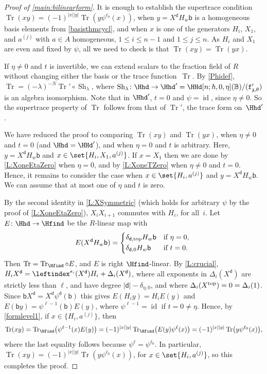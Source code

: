 \documentclass[a4paper,11pt]{amsart}
\newcommand{\Tr}{\op{Tr}}
\numberwithin{equation}{subsection}
\theoremstyle{definition}
\theoremstyle{theorem}
\theoremstyle{remark}
\newcommand\charge{{\mathfrak{z}}}
\newcommand\fct{\mathtt{f}_{\charge,\theta}}
\newcommand\Sh[1][\lambda]{\op{Sh}_{#1}}
\newcommand\ELL{\text{\scriptsize top}}%
\newcommand\bd{\mathsf{d}}
\newcommand\bb{\mathsf{b}}
\newcommand\op{\operatorname}
\newcommand{\Bo}{\mathbb{B}}
\begin{document}
      \begin{proof}[Proof of \autoref{main:bilinearform}]
It is enough to establish the supertrace condition
$\Tr(xy)=(-1)^{|x||y|}\Tr(y\psi^{\ell_0}(x))$, when $y=X^\bd H_w\bb$ is
a homogeneous basis elements from \autoref{basisthmcycl}, and when $x$
is one of the generators $H_i$, $X_1$, and $a^{(j)}$ with $a\in A$
homogeneous, $1\leq i\leq n-1$ and $1\leq j\leq n$. As $H_i$ and $X_1$
are even and fixed by $\psi$, all we need to check is that
$\Tr(xy)=\Tr(yx)$.

If $\eta\neq0$ and $t$ is invertible, we can extend scalars to the
fraction field of $R$ without changing either the basis or the trace
function~$\Tr$. By \autoref{Phidef}, $\Tr=(-\lambda)^{-N}\Tr'\circ\Sh$,
where $\Sh\colon\Hhd\to{\Hhd}'=\HHd[n;\hbar,0,\eta](\Bo)/(\fct')$ is an
algebra isomorphism. Note that in ${\Hhd}'$, $t=0$ and $\psi=\op{id}$,
since $\eta\neq0$. So the supertrace property of $\Tr$ follows from that
of $\Tr'$, the trace form on~${\Hhd}'$.

We have reduced the proof to comparing $\Tr(xy)$ and $\Tr(yx)$, when
$\eta\ne0$ and $t=0$ (and $\Hhd=\HHd'$), and when $\eta=0$ and
$t$ is arbitrary. Here, $y=X^\bd H_w\bb$ and
$x\in\set{H_i,X_1,a^{(j)}}$. If $x=X_1$ then we are done by
\autoref{L:XoneEtaZero} when $\eta=0$, and by \autoref{L:XoneTZero} when
$\eta\ne0$ and $t=0$. Hence, it remains to consider the case when
$x\in\set{H_i,a^{(j)}}$ and $y=X^\bd H_w\bb$. We can assume that at most
one of $\eta$ and $t$ is zero.

By the second identity in \autoref{L:XSymmetric} (which holds for arbitrary $\psi$ by the proof of \autoref{L:XoneEtaZero}), $X_iX_{i+1}$ commutes with $H_i$, for
all~$i$. Let $E\colon\Hhd\to\Hfind$ be the $R$-linear map with
\[
   E(X^\bd H_w\bb)=\begin{cases*}
     \delta_{\bd,\ELL}H_w\bb& if $\eta=0$, \\
     \delta_{\bd,0}H_w\bb& if $t=0$.
   \end{cases*}
\]
Then $\Tr=\Tr_{\Hfind}\circ E$, and $E$ is right $\Hfind$-linear. By
\autoref{L:crucial},
$H_iX^\bd=\leftindex^{s_i}(X^\bd)H_i+\Delta_i(X^\bd)$, where
all exponents in $\Delta_i(X^\bd)$ are strictly less than $\ell$, and
have degree $|\bd|-\delta_{\eta,0}$, and where
$\Delta_i(X^{\ELL})=0=\Delta_i(1)$. Since $\bb
X^\bd=X^\bd\psi^{\bd}(\bb)$ this gives $E(H_iy)=H_iE(y)$ and $E(\bb
y)=\psi^{\ell-1}(\bb)E(y)$, where $\psi^{\ell-1}=\op{id}$ if
$t=0\neq\eta$. Hence, by \autoref{formlevel1}, if $x\in\{H_i,a^{(j)}\}$,
then
\begin{equation}\label{Tryx}
\Tr(xy)=\Tr_{\Hfind}\bigl(\psi^{\ell-1}(x)E(y)\bigr)=(-1)^{|x||y|}\Tr_{\Hfind}\bigl(E(y)\psi^{\ell}(x)\bigr)=(-1)^{|x||y|}\Tr\bigl(y\psi^{\ell_0}(x)\bigr),
\end{equation}
where the last equality follows because $\psi^\ell=\psi^{\ell_0}$. In
particular, $\Tr(xy)=(-1)^{|x||y|}\Tr(y\psi^{\ell_0}(x))$, for
$x\in\set{H_i,a^{(j)}}$, so this completes the proof.
\end{proof}
\end{document}
